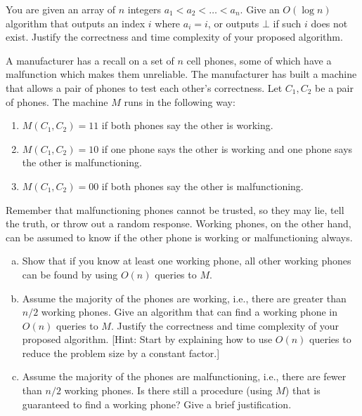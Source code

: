 \documentclass[11pt]{article}
\begin{document}
    \newpage
    
    \begin{tcolorbox}[title={Problem 2 (Array Search, 30 pts)}]
        You are given an array of $n$ integers $a_1 < a_2 < \dots < a_n$. Give an $O(\log n)$ algorithm that outputs an index $i$ where $a_i = i$, or outputs $\bot$ if such $i$ does not exist. Justify the correctness and time complexity of your proposed algorithm.
    \end{tcolorbox}
    
    \newpage
    
    \begin{tcolorbox}[title={Problem 3 (Malfunctioning Phones, 40 pts)}]
        A manufacturer has a recall on a set of $n$ cell phones, some of which have a malfunction which makes them unreliable. The manufacturer has built a machine that allows a pair of phones to test each other's correctness. Let $C_1, C_2$ be a pair of phones. The machine $M$ runs in the following way:
        \begin{enumerate}
            \item $M(C_1, C_2) = 11$ if both phones say the other is working.
            \item $M(C_1, C_2) = 10$ if one phone says the other is working and one phone says the other is malfunctioning. 
            \item $M(C_1, C_2) = 00$ if both phones say the other is malfunctioning. 
        \end{enumerate}
        Remember that malfunctioning phones cannot be trusted, so they may lie, tell the truth, or throw out a random response. Working phones, on the other hand, can be assumed to know if the other phone is working or malfunctioning always. 
        \begin{enumerate}[(a)]
            \item Show that if you know at least one working phone, all other working phones can be found by using $O(n)$ queries to $M$.
            \item Assume the majority of the phones are working, i.e., there are greater than $n/2$ working phones. Give an algorithm that can find a working phone in $O(n)$ queries to $M$. Justify the correctness and time complexity of your proposed algorithm. [Hint: Start by explaining how to use $O(n)$ queries to reduce the problem size by a constant factor.]
            \item Assume the majority of the phones are malfunctioning, i.e., there are fewer than $n/2$ working phones. Is there still a procedure (using $M$) that is guaranteed to find a working phone? Give a brief justification.
        \end{enumerate}
    \end{tcolorbox}
    
\end{document}

